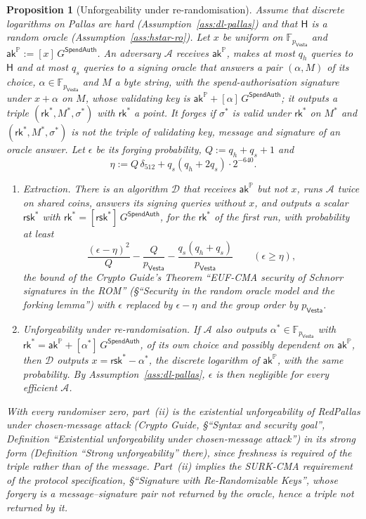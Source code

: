 \documentclass[11pt,a4paper]{article}
\newtheorem{proposition}[theorem]{Proposition}
\theoremstyle{definition}
\newcommand{\F}{\mathbb{F}}
\newcommand{\PP}{\mathbb{P}}
\newcommand{\Adv}{\mathcal{A}}
\newcommand{\rk}{\mathsf{rk}}
\newcommand{\Vesta}{\ensuremath{\mathsf{Vesta}}}
\newcommand{\aksym}{\ensuremath{\mathsf{ak}}}
\newcommand{\rsk}{\ensuremath{\mathsf{rsk}}}
\begin{document}
\begin{proposition}[Unforgeability under re-randomisation]%
\label{prop:redpallas-euf}
Assume that discrete logarithms on Pallas are hard
(Assumption~\ref{ass:dl-pallas}) and that $\mathsf{H}$ is a random oracle
(Assumption~\ref{ass:hstar-ro}). Let $x$ be uniform on $\F_{p_{\Vesta}}$ and
$\aksym^{\PP} := [x]\,G^{\mathsf{SpendAuth}}$. An adversary $\Adv$ receives
$\aksym^{\PP}$, makes at most $q_h$ queries to $\mathsf{H}$ and at most $q_s$
queries to a signing oracle that answers a pair $(\alpha, M)$ of its choice,
$\alpha \in \F_{p_{\Vesta}}$ and $M$ a byte string, with the
spend-authorisation signature under $x + \alpha$ on $M$, whose validating
key is $\aksym^{\PP} + [\alpha]\,G^{\mathsf{SpendAuth}}$; it outputs a triple
$(\rk^{*}, M^{*}, \sigma^{*})$ with $\rk^{*}$ a point. It \emph{forges} if
$\sigma^{*}$ is valid under $\rk^{*}$ on $M^{*}$ and
$(\rk^{*}, M^{*}, \sigma^{*})$ is not the triple of validating key, message
and signature of an oracle answer. Let $\epsilon$ be its forging probability,
$Q := q_h + q_s + 1$ and
\[
  \eta := Q\,\delta_{512} + q_s (q_h + 2 q_s) \cdot 2^{-640}.
\]
\begin{enumerate}
\item[(i)] \emph{Extraction.} There is an algorithm $\mathcal{D}$ that
  receives $\aksym^{\PP}$ but not $x$, runs $\Adv$ twice on shared coins,
  answers its signing queries without $x$, and outputs a scalar $\rsk^{*}$
  with $\rk^{*} = [\rsk^{*}]\,G^{\mathsf{SpendAuth}}$, for the $\rk^{*}$ of
  the first run, with probability at least
  \[
    \frac{(\epsilon - \eta)^{2}}{Q} - \frac{Q}{p_{\Vesta}}
      - \frac{q_s (q_h + q_s)}{p_{\Vesta}}
    \qquad (\epsilon \ge \eta),
  \]
  the bound of the \emph{Crypto Guide}'s Theorem ``EUF-CMA security of
  Schnorr signatures in the ROM'' (\S``Security in the random oracle model
  and the forking lemma'') with $\epsilon$ replaced by $\epsilon - \eta$ and
  the group order by $p_{\Vesta}$.
\item[(ii)] \emph{Unforgeability under re-randomisation.} If $\Adv$ also
  outputs $\alpha^{*} \in \F_{p_{\Vesta}}$ with
  $\rk^{*} = \aksym^{\PP} + [\alpha^{*}]\,G^{\mathsf{SpendAuth}}$, of its own
  choice and possibly dependent on $\aksym^{\PP}$, then $\mathcal{D}$ outputs
  $x = \rsk^{*} - \alpha^{*}$, the discrete logarithm of $\aksym^{\PP}$, with
  the same probability. By Assumption~\ref{ass:dl-pallas}, $\epsilon$ is
  then negligible for every efficient $\Adv$.
\end{enumerate}
With every randomiser zero, part~(ii) is the existential unforgeability of
RedPallas under chosen-message attack (\emph{Crypto Guide}, \S``Syntax and
security goal'', Definition ``Existential unforgeability under
chosen-message attack'') in its strong form (Definition ``Strong
unforgeability'' there), since freshness is required of the triple rather
than of the message. Part~(ii) implies the SURK-CMA requirement of the
protocol specification, \S``Signature with Re-Randomizable Keys'', whose
forgery is a message--signature pair not returned by the oracle, hence a
triple not returned by it.
\end{proposition}
\end{document}

